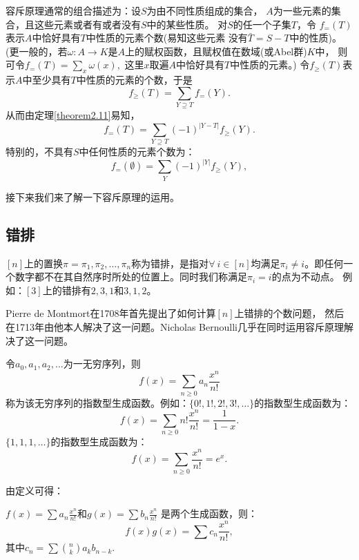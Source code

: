 容斥原理通常的组合描述为：设$S$为由不同性质组成的集合，
$A$为一些元素的集合，且这些元素或者有或者没有$S$中的某些性质。
对$S$的任一个子集$T$，令
$f_=(T)$表示$A$中恰好具有$T$中性质的元素个数(易知这些元素
没有$\bar{T}=S-T$中的性质)。(更一般的，若$\omega\colon A\rightarrow
K$是$A$上的赋权函数，且赋权值在数域(或Abel群)$K$中，
则可令$f_{=}(T)=\sum_x \omega(x),$
这里$x$取遍$A$中恰好具有$T$中性质的元素。)
令$f_{\geq}(T)$表示$A$中至少具有$T$中性质的元素的个数，于是
\begin{equation}\label{equation3}
f_{\geq}(T)=\sum_{Y\supseteq T}f_{=} (Y).
\end{equation}
从而由定理\ref{theorem2.11}易知，
\begin{equation}\label{equation4}
f_{=}(T)=\sum_{Y\supseteq T}(-1)^{|Y-T|}f_{\geq}(Y).
\end{equation}
特别的，不具有$S$中任何性质的元素个数为：
\begin{equation}\label{equation5}
f_{=}(\emptyset)=\sum_Y (-1)^{|Y|} f_{\geq}(Y),
\end{equation}

接下来我们来了解一下容斥原理的运用。

\subsection{错排}

\begin{defi}
$[n]$上的置换$\pi=\pi_1,\pi_2,\ldots,
\pi_n$称为错排，是指对$\forall\  i\in [n]$均满足$\pi_i\ne
i$。即任何一个数字都不在其自然序时所处的位置上。同时我们称满足$\pi_i=i$的点为不动点。
例如：$[3]$上的错排有$2,3,1$和$3,1,2$。
\end{defi}


Pierre de Montmort在1708年首先提出了如何计算$[n]$上错排的个数问题，
然后在1713年由他本人解决了这一问题。Nicholas
Bernoulli几乎在同时运用容斥原理解决了这一问题。


\begin{defi}
令$a_0,a_1,a_2,\ldots$为一无穷序列，则
$$f(x)=\sum_{n\geq0}a_n\frac{x^n}{n!}$$
称为该无穷序列的指数型生成函数。例如：$\{0!,1!,2!,3!,\ldots\}$的指数型生成函数为：
$$f(x)=\sum_{n\ge0}n!\frac{x^n}{n!}=\frac{1}{1-x}.$$
$\{1,1,1,\ldots\}$的指数型生成函数为：
$$f(x)=\sum_{n\ge0}\frac{x^n}{n!}=e^x.$$
\end{defi}
由定义可得：

\begin{thm}
$f(x)=\sum a_n\frac{x^n}{n!}$和$g(x)=\sum b_n\frac{x^n}{n!}$
是两个生成函数，则：
$$f(x)g(x)=\sum c_n\frac{x^n}{n!},$$
其中$c_n=\sum{n\choose k}a_kb_{n-k}.$
\end{thm}

